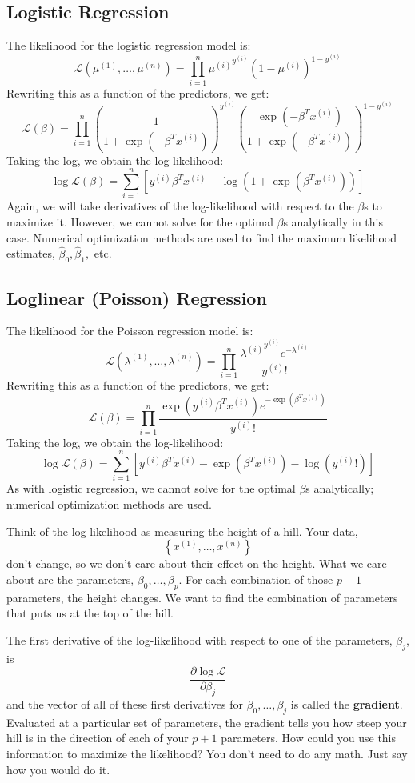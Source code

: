 \subsection{Logistic Regression}

The likelihood for the logistic regression model is:
$$ \mathcal{L}(\mu^{(1)}, \dots, \mu^{(n)}) = \prod_{i=1}^n {\mu^{(i)}}^{y^{(i)}} (1-\mu^{(i)})^{1 - y^{(i)}} $$
Rewriting this as a function of the predictors, we get:
$$ \mathcal{L}(\beta) = \prod_{i=1}^n \left( \frac{1}{1 + \exp(-\beta^T x^{(i)})} \right)^{y^{(i)}} \left( \frac{\exp(-\beta^T x^{(i)})}{1 + \exp(-\beta^T x^{(i)})} \right)^{1 - y^{(i)}} $$
Taking the log, we obtain the log-likelihood:
$$ \log \mathcal{L}(\beta) = \sum_{i=1}^n \left[ y^{(i)} \beta^T x^{(i)} - \log \left(1 + \exp(\beta^T x^{(i)}) \right) \right] $$
Again, we will take derivatives of the log-likelihood with respect to the $\beta$s to maximize it. However, we cannot solve for the optimal $\beta$s analytically in this case. Numerical optimization methods are used to find the maximum likelihood estimates, $\hat{\beta}_0, \hat{\beta}_1,$ etc.

\subsection{Loglinear (Poisson) Regression}

The likelihood for the Poisson regression model is:
$$ \mathcal{L}(\lambda^{(1)}, \dots, \lambda^{(n)}) = \prod_{i=1}^n \frac{{\lambda^{(i)}}^{y^{(i)}} e^{-\lambda^{(i)}}}{y^{(i)}!} $$
Rewriting this as a function of the predictors, we get:
$$ \mathcal{L}(\beta) = \prod_{i=1}^n \frac{\exp{(y^{(i)} \beta^T x^{(i)})} e^{-\exp{(\beta^T x^{(i)})}}}{y^{(i)}!} $$
Taking the log, we obtain the log-likelihood:
$$ \log \mathcal{L}(\beta) = \sum_{i=1}^n \left[ y^{(i)} \beta^T x^{(i)} - \exp(\beta^T x^{(i)}) - \log (y^{(i)}!) \right] $$
As with logistic regression, we cannot solve for the optimal $\beta$s analytically; numerical optimization methods are used. 
\vspace{1mm}

\begin{question}{}
Think of the log-likelihood as measuring the height of a hill. Your data, 
$$\left\{x^{(1)},\dots,x^{(n)}\right\}$$ 
don't change, so we don't care about their effect on the height. What we care about are the parameters, $\beta_0, \dots, \beta_p$. For each combination of those $p+1$ parameters, the height changes. We want to find the combination of parameters that puts us at the top of the hill. 

The first derivative of the log-likelihood with respect to one of the parameters, $\beta_j$, is
$$ \frac{\partial \log \mathcal{L}}{\partial \beta_j} $$
and the vector of all of these first derivatives for $\beta_0, \dots, \beta_j$ is called the \textbf{gradient}. Evaluated at a particular set of parameters, the gradient tells you how steep your hill is in the direction of each of your $p+1$ parameters. How could you use this information to maximize the likelihood? You don't need to do any math. Just say how you would do it.
\end{question}

